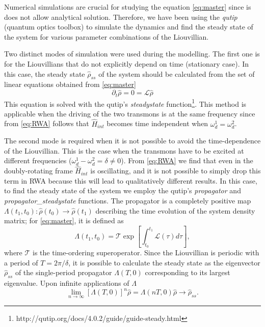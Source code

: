 \documentclass[%
 pra,
 amsmath,amssymb,
 reprint,%
]{revtex4-1}
\begin{document}
Numerical simulations are crucial for studying the equation \eqref{eq:master} since is does not allow  analytical solution. Therefore, we have been using the \textit{qutip}\cite{johansson2013qutip} (quantum optics toolbox) to simulate the dynamics and find the steady state of the system for various parameter combinations of the Liouvillian.

Two distinct modes of simulation were used during the modelling. The first one is for the Liouvillians that do not explicitly depend on time (stationary case). In this case, the steady state $\hat \rho_{ss}$ of the system should be calculated from the set of linear equations obtained from \eqref{eq:master}
\begin{equation}
\partial_t \hat \rho = 0 = \mathcal{L} \hat \rho
\end{equation}
This equation is solved with the qutip's \textit{steadystate} function\footnote{http://qutip.org/docs/4.0.2/guide/guide-steady.html}. This method is applicable when the driving of the two transmons is at the same frequency since from \eqref{eq:RWA} follows that $\hat H_{int}$ becomes time independent when $\omega_d^1 = \omega_d^2$.

The second mode is required when it is not possible to avoid the time-dependence of the Liouvillian. This is the case when the transmons have to be excited at different frequencies ($\omega_d^1 - \omega_d^2 = \delta \neq 0$). From \eqref{eq:RWA} we find that even in the doubly-rotating frame $\hat H_{int}$ is oscillating, and it is not possible to simply drop this term in RWA because this will lead to qualitatively different results. In this case, to find the steady state of the system we employ the qutip's \textit{propagator} and \textit{propagator\_steadystate} functions. The propagator is a completely positive map $\Lambda(t_1, t_0): \hat \rho(t_0) \rightarrow \hat \rho(t_1)$ describing the time evolution of the system density matrix; for \eqref{eq:master}, it is defined as
\begin{equation}
\Lambda(t_1, t_0) = \mathcal{T} \exp [\int_{t_0}^{t_1} \mathcal L(\tau) d\tau],
\label{eq:propagator}
\end{equation}
where $\mathcal T$ is the time-ordering superoperator. Since the Liouvillian is periodic with a period of $T = 2\pi/\delta$, it is possible to calculate the steady state as the eigenvector $\hat \rho_{ss}$ of the single-period propagator $\Lambda(T, 0)$ corresponding to its largest eigenvalue\cite{dittrich1998quantum, rivas2012open}. Upon infinite applications of $\Lambda$
\[
\lim_{n\to \infty} \left[\Lambda(T, 0)\right]^n \hat \rho = \Lambda(nT, 0) \hat \rho \to \hat \rho_{ss}.
\]
\end{document}
